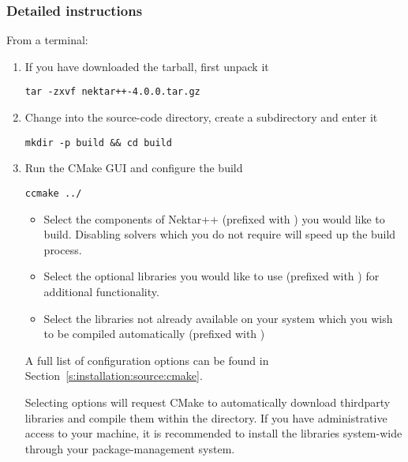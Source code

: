 \subsubsection{Detailed instructions}
From a terminal:
\begin{enumerate}
    \item If you have downloaded the tarball, first unpack it
    \begin{lstlisting}[style=BashInputStyle]
    tar -zxvf nektar++-4.0.0.tar.gz
    \end{lstlisting}
    
    \item Change into the source-code directory, create a 
    subdirectory and enter it 
    \begin{lstlisting}[style=BashInputStyle]
    mkdir -p build && cd build
    \end{lstlisting}
    
    \item Run the CMake GUI and configure the build
    \begin{lstlisting}[style=BashInputStyle]
    ccmake ../
    \end{lstlisting}
    \begin{itemize}
        \item Select the components of Nektar++ (prefixed with
        ) you would like to build. Disabling solvers
        which you do not require will speed up the build process.
        \item Select the optional libraries you would like to use (prefixed with
        ) for additional functionality.
        \item Select the libraries not already available on your system which
        you wish to be compiled automatically (prefixed with 
        )
    \end{itemize}
    A full list of configuration options can be found in
    Section~\ref{s:installation:source:cmake}.

    \begin{notebox}
    Selecting  options will request CMake to
    automatically download thirdparty libraries and compile them within the
    \nekpp directory. If you have administrative access to your machine, it is
    recommended to install the libraries system-wide through your
    package-management system.
    \end{notebox}
    

\end{enumerate}
